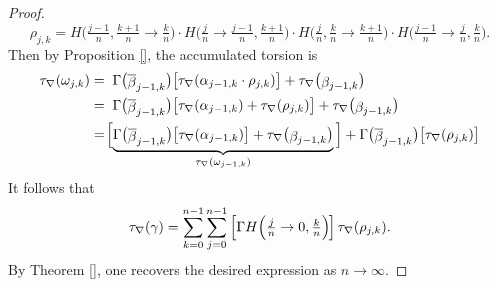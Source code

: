 \begin{proof}
\begin{equation}
   \rho_{j, k} = H\Big(\tfrac{j-1}{n}, \tfrac{k+1}{n} \to \tfrac{k}{n}\Big) \cdot H\Big(\tfrac{j}{n} \to \tfrac{j-1}{n}, \tfrac{k+1}{n}\Big) \cdot  H\Big(\tfrac{j}{n}, \tfrac{k}{n} \to \tfrac{k + 1}{n}\Big) \cdot H\Big(\tfrac{j-1}{n} \to \tfrac{j}{n}, \tfrac{k}{n}\Big).
  \end{equation}
  Then by Proposition \ref{}, the accumulated torsion is
  \begin{align}
    \tau_\nabla(\omega_{j,k}) 
    &= \; \Gamma\big(\raisebox{-1.5pt}{$\overline{\beta}_{j-1, k}$}\big) \big[ \tau_\nabla(\alpha_{j-1, k} \cdot  \rho_{j, k}) \big] + \tau_\nabla\big(\raisebox{-1.5pt}{$\beta_{j-1, k}$}\big) \\
    &= \; \Gamma\big(\raisebox{-1.5pt}{$\overline{\beta}_{j-1, k}$}\big) \big[ \tau_\nabla(\alpha_{j-1, k}) + \tau_\nabla(\rho_{j, k}) \big] + \tau_\nabla\big(\raisebox{-1.5pt}{$\beta_{j-1, k}$}\big) \\
    &=\!\Big[\! \underbrace{\Gamma\big(\raisebox{-1.5pt}{$\overline{\beta}_{j-1, k}$}\big) \big[ \tau_\nabla(\alpha_{j-1, k}) \big] + \tau_\nabla\big(\raisebox{-1.5pt}{$\beta_{j-1, k}$}\big)}_{\tau_\nabla(\omega_{j-1, k})}\Big] + \Gamma\big(\raisebox{-1.5pt}{$\overline{\beta}_{j-1, k}$}\big) \big[\tau_\nabla(\rho_{j, k})\big]
  \end{align}
  It follows that 
  \begin{equation}
    \tau_\nabla(\gamma) = \sum_{k=0}^{n-1}\sum_{j = 0}^{n-1} \left[ \Gamma H\Big(\tfrac{j}{n} \to 0, \tfrac{k}{n}\Big)\hspace{-1pt} \right] \tau_\nabla(\rho_{j, k}).
  \end{equation}
  By Theorem \ref{}, one recovers the desired expression as $n \to \infty$.
\end{proof}

